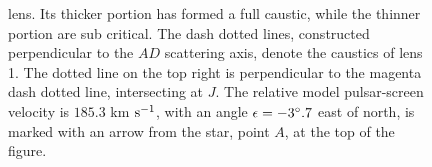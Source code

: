 \documentclass[useAMS,usenatbib]{mn2e}
\begin{document}
\begin{figure}
{lens.  Its thicker portion has formed a full caustic, while the
thinner portion are sub critical.
The dash 
dotted lines, constructed perpendicular to the $AD$ scattering axis,
denote the caustics of lens 1. The dotted line on the top right is
perpendicular to the magenta dash dotted line, intersecting at $J$. %
The relative model pulsar-screen velocity is $185.3$ km $\rm s^{-1}$, with an angle $\epsilon=-3\degree.7$ east of north, is marked with an arrow from the star, point $A$, at the top of the figure.} 
\label{Doublelens}
\end{figure}







\end{document}
